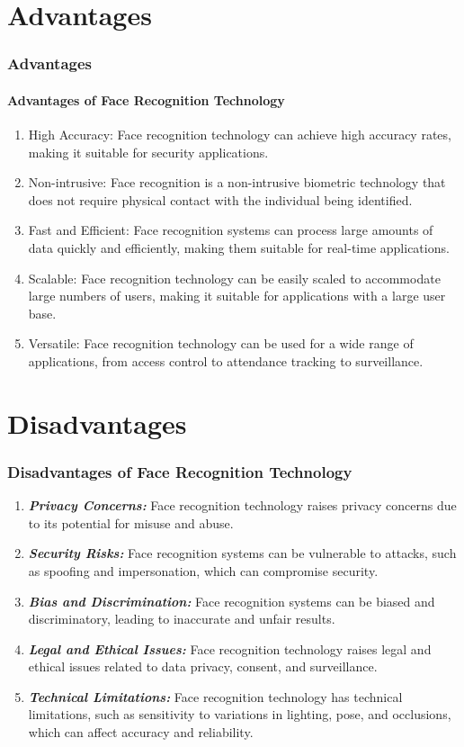 \documentclass[aspectratio=169]{beamer}
\begin{document}
\section{Advantages}
\begin{frame}
	\centering
	\frametitle{Advantages}
	\framesubtitle{Advantages of Face Recognition Technology}
	\begin{minipage}{0.95\textwidth}
		\begin{enumerate}
			\item High Accuracy: Face recognition technology can achieve high accuracy rates, making it suitable for security applications.
			\item Non-intrusive: Face recognition is a non-intrusive biometric technology that does not require physical contact with the individual being identified.
			\item Fast and Efficient: Face recognition systems can process large amounts of data quickly and efficiently, making them suitable for real-time applications.
			\item Scalable: Face recognition technology can be easily scaled to accommodate large numbers of users, making it suitable for applications with a large user base.
			\item Versatile: Face recognition technology can be used for a wide range of applications, from access control to attendance tracking to surveillance.
		\end{enumerate}
	\end{minipage}
\end{frame}

\section{Disadvantages}
\begin{frame}
	\centering
	\frametitle{Disadvantages of Face Recognition Technology}
	\begin{minipage}{0.95\textwidth}
		\begin{enumerate}
			\item \textbf{\textit{Privacy Concerns:}} Face recognition technology raises privacy concerns due to its potential for misuse and abuse.
			\item \textbf{\textit{Security Risks:}} Face recognition systems can be vulnerable to attacks, such as spoofing and impersonation, which can compromise security.
			\item \textbf{\textit{Bias and Discrimination:}} Face recognition systems can be biased and discriminatory, leading to inaccurate and unfair results.
			\item \textbf{\textit{Legal and Ethical Issues:}} Face recognition technology raises legal and ethical issues related to data privacy, consent, and surveillance.
			\item \textbf{\textit{Technical Limitations:}} Face recognition technology has technical limitations, such as sensitivity to variations in lighting, pose, and occlusions, which can affect accuracy and reliability.
		\end{enumerate}
	\end{minipage}
\end{frame}
\end{document}
